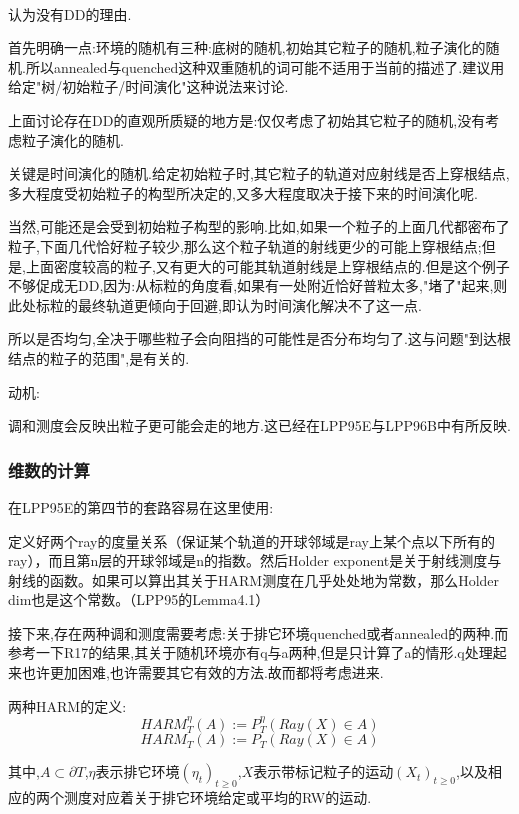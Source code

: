 				\begin{conjec}
					\ 

					认为没有DD的理由.

					首先明确一点:环境的随机有三种:底树的随机,初始其它粒子的随机,粒子演化的随机.所以annealed与quenched这种双重随机的词可能不适用于当前的描述了.建议用给定"树/初始粒子/时间演化"这种说法来讨论.

					上面讨论存在DD的直观所质疑的地方是:仅仅考虑了初始其它粒子的随机,没有考虑粒子演化的随机.					

					关键是时间演化的随机.给定初始粒子时,其它粒子的轨道对应射线是否上穿根结点,多大程度受初始粒子的构型所决定的,又多大程度取决于接下来的时间演化呢.

					当然,可能还是会受到初始粒子构型的影响.比如,如果一个粒子的上面几代都密布了粒子,下面几代恰好粒子较少,那么这个粒子轨道的射线更少的可能上穿根结点;但是,上面密度较高的粒子,又有更大的可能其轨道射线是上穿根结点的.但是这个例子不够促成无DD,因为:从标粒的角度看,如果有一处附近恰好普粒太多,"堵了"起来,则此处标粒的最终轨道更倾向于回避,即认为时间演化解决不了这一点.

					所以是否均匀,全决于哪些粒子会向阻挡的可能性是否分布均匀了.这与问题"到达根结点的粒子的范围",是有关的.
				\end{conjec}

			动机:

				调和测度会反映出粒子更可能会走的地方.这已经在LPP95E与LPP96B中有所反映.



		\subsubsection*{维数的计算}

			在LPP95E的第四节的套路容易在这里使用:

			定义好两个ray的度量关系（保证某个轨道的开球邻域是ray上某个点以下所有的ray），而且第n层的开球邻域是n的指数。然后Holder exponent是关于射线测度与射线的函数。如果可以算出其关于HARM测度在几乎处处地为常数，那么Holder dim也是这个常数。（LPP95的Lemma4.1）

			接下来,存在两种调和测度需要考虑:关于排它环境quenched或者annealed的两种.而参考一下R17的结果,其关于随机环境亦有q与a两种,但是只计算了a的情形.q处理起来也许更加困难,也许需要其它有效的方法.故而都将考虑进来.

			两种HARM的定义:
			$$HARM^{\eta}_T(A) := P^{\eta}_T(Ray(X)\in A)$$
			$$HARM_T(A) := P_T(Ray(X)\in A)$$

			其中,$A \subset \partial T$,$\eta$表示排它环境$(\eta_t)_{t \ge 0}$,$X$表示带标记粒子的运动$(X_t)_{t \ge 0}$,以及相应的两个测度对应着关于排它环境给定或平均的RW的运动.


